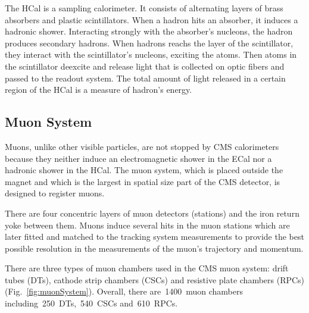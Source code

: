 The HCal is a sampling calorimeter. It consists of alternating layers of brass absorbers and plastic scintillators. When a hadron hits an absorber, it induces a hadronic shower. Interacting strongly with the absorber's nucleons, the hadron produces secondary hadrons. When hadrons reachs the layer of the scintillator, they interact with the scintillator's nucleons, exciting the atoms. Then atoms in the scintillator deexcite and release light that is collected on optic fibers and passed to the readout system. The total amount of light released in a certain region of the HCal is a measure of hadron's energy. 


\subsection{Muon System}

Muons, unlike other visible particles, are not stopped by CMS calorimeters because they neither induce an electromagnetic shower in the ECal nor a hadronic shower in the HCal. The muon system, which is placed outside the magnet and which is the largest in spatial size part of the CMS detector, is designed to register muons.

There are four concentric layers of muon detectors (stations) and the iron return yoke between them. Muons induce several hits in the muon stations which are later fitted and matched to the tracking system measurements to provide the best possible resolution in the measurements of the muon's trajectory and momentum.

There are three types of muon chambers used in the CMS muon system: drift tubes (DTs), cathode strip chambers (CSCs) and resistive plate chambers (RPCs) (Fig.~\ref{fig:muonSystem}). Overall, there are~1400~muon chambers including~250~DTs,~540~CSCs and~610~RPCs.

